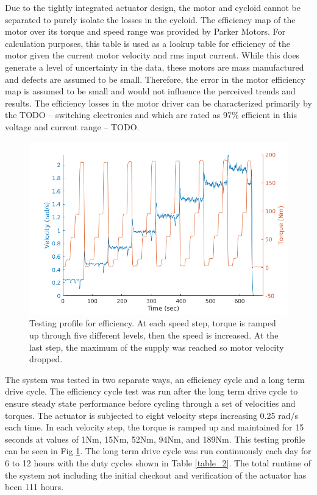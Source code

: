 Due to the tightly integrated actuator design, the motor and cycloid cannot be separated to purely isolate the losses in the cycloid.
The efficiency map of the motor over its torque and speed range was provided by Parker Motors.
For calculation purposes, this table is used as a lookup table for efficiency of the motor given the current motor velocity and rms input current.
While this does generate a level of uncertainty in the data, these motors are mass manufactured and defects are assumed to be small.
Therefore, the error in the motor efficiency map is assumed to be small and would not influence the perceived trends and results.
The efficiency losses in the motor driver can be characterized primarily by the TODO -- switching electronics and which are rated as 97\% efficient in this voltage and current range -- TODO.

\begin{figure}[!b]
   \centering
   \includegraphics[width=\linewidth]{images/eff_test_profile_v4}
   \caption{Testing profile for efficiency.
   At each speed step, torque is ramped up through five different levels, then the speed is increased.
   At the last step, the maximum of the supply was reached so motor velocity dropped.}
   \label{eff_profile}
\end{figure}

The system was tested in two separate ways, an efficiency cycle and a long term drive cycle.
The efficiency cycle test was run after the long term drive cycle to ensure steady state performance before cycling through a set of velocities and torques.
The actuator is subjected to eight velocity steps increasing 0.25 rad/s each time.
In each velocity step, the torque is ramped up and maintained for 15 seconds at values of 1Nm, 15Nm, 52Nm, 94Nm, and 189Nm.
This testing profile can be seen in Fig \ref{eff_profile}.
The long term drive cycle was run continuously each day for 6 to 12 hours with the duty cycles shown in Table \ref{table_2}.
The total runtime of the system not including the initial checkout and verification of the actuator has been 111 hours.

